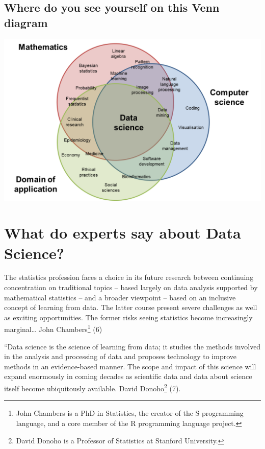 \documentclass[
  letterpaper,
  DIV=11,
  numbers=noendperiod]{scrreprt}
\begin{document}
\hypertarget{where-do-you-see-yourself-on-this-venn-diagram}{%
\subsection{Where do you see yourself on this Venn
diagram}\label{where-do-you-see-yourself-on-this-venn-diagram}}

\includegraphics{./images/paste-494B1CA8.png}

\hypertarget{what-do-experts-say-about-data-science}{%
\section{What do experts say about Data
Science?}\label{what-do-experts-say-about-data-science}}

The statistics profession faces a choice in its future research between
continuing concentration on traditional topics -- based largely on data
analysis supported by mathematical statistics -- and a broader viewpoint
-- based on an inclusive concept of learning from data. The latter
course present severe challenges as well as exciting opportunities. The
former risks seeing statistics become increasingly marginal\ldots{} John
Chambers\footnote{John Chambers is a PhD in Statistics, the creator of
  the S programming language, and a core member of the R programming
  language project.} (6)

``Data science is the science of learning from data; it studies the
methods involved in the analysis and processing of data and proposes
technology to improve methods in an evidence-based manner. The scope and
impact of this science will expand enormously in coming decades as
scientific data and data about science itself become ubiquitously
available. David Donoho\footnote{David Donoho is a Professor of
  Statistics at Stanford University.} (7).
\end{document}
